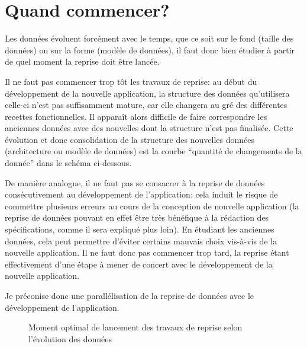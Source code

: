\documentclass{book}
\begin{document}
\section{Quand commencer?}

Les données évoluent forcément avec le temps, que ce soit sur le fond (taille des données) ou sur la forme (modèle de données), il faut donc bien étudier à partir de quel moment la reprise doit être lancée.

Il ne faut pas commencer trop tôt les travaux de reprise: au début du développement de la nouvelle application, la structure des données qu'utilisera celle-ci n'est pas suffisamment mature, car elle changera au gré des différentes recettes fonctionnelles. Il apparaît alors difficile de faire correspondre les anciennes données avec des nouvelles dont la structure n'est pas finalisée. Cette évolution et donc consolidation de la structure des nouvelles données (architecture ou modèle de données) est la courbe ``quantité de changements de la donnée'' dans le schéma ci-dessous.

De manière analogue, il ne faut pas se consacrer à la reprise de données consécutivement au développement de l'application: cela induit le risque de commettre plusieurs erreurs au cours de la conception de nouvelle application (la reprise de données pouvant en effet être très bénéfique à la rédaction des spécifications, comme il sera expliqué plus loin). En étudiant les anciennes données, cela peut permettre d'éviter certains mauvais choix vis-à-vis de la nouvelle application. Il ne faut donc pas commencer trop tard, la reprise étant effectivement d'une étape à mener de concert avec le développement de la nouvelle application.

Je préconise donc une parallélisation de la reprise de données avec le développement de l'application.

\begin{figure}[!h]
 \begin{center}
 \end{center}
 \caption{Moment optimal de lancement des travaux de reprise selon l'évolution des données}
 \label{Moment optimal de lancement des travaux de reprise selon l'évolution des données}
\end{figure}
\end{document}
